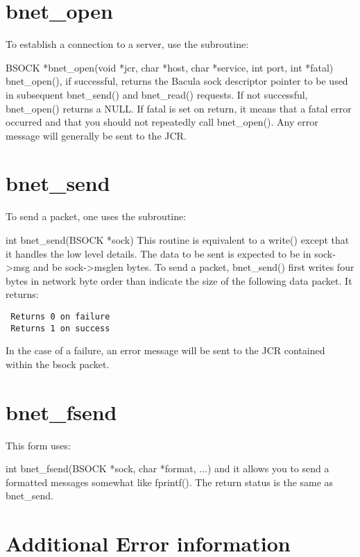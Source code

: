 \section{bnet\_open}

To establish a connection to a server, use the subroutine:

BSOCK *bnet\_open(void *jcr, char *host, char *service, int port,  int *fatal)
bnet\_open(), if successful, returns the Bacula sock descriptor pointer to be
used in subsequent bnet\_send() and bnet\_read() requests. If not successful,
bnet\_open() returns a NULL. If fatal is set on return, it means that a fatal
error occurred and that you should not repeatedly call bnet\_open(). Any error
message will generally be sent to the JCR.

\section{bnet\_send}

To send a packet, one uses the subroutine:

int bnet\_send(BSOCK *sock) This routine is equivalent to a write() except
that it handles the low level details. The data to be sent is expected to be
in sock-{\textgreater}msg and be sock-{\textgreater}msglen bytes. To send a packet, bnet\_send()
first writes four bytes in network byte order than indicate the size of the
following data packet. It returns:

\footnotesize
\begin{verbatim}
 Returns 0 on failure
 Returns 1 on success
\end{verbatim}
\normalsize

In the case of a failure, an error message will be sent to the JCR contained
within the bsock packet.

\section{bnet\_fsend}

This form uses:

int bnet\_fsend(BSOCK *sock, char *format, ...) and it allows you to send a
formatted messages somewhat like fprintf(). The return status is the same as
bnet\_send.

\section{Additional Error information}

